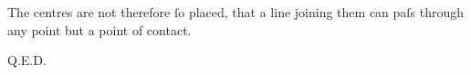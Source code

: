 \documentclass[12pt,preview]{standalone}
\begin{document}
\begin{minipage}[t]{0.64\textwidth}
    \hfill

    The centres are not therefore ſo placed, that a line joining them can paſs through any point but a point of contact.

    \hfill

    \hfill Q.E.D.
\end{minipage}%
\end{document}
